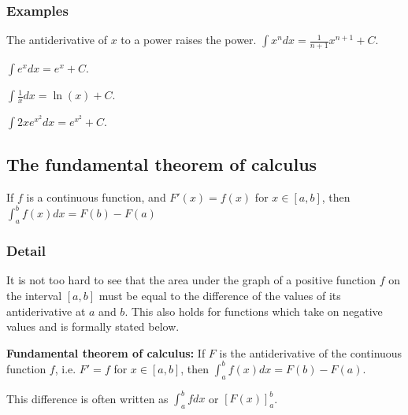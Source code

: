 \documentclass[12pt,a4paper]{article}
\theoremstyle{regla}
\theoremstyle{remark}
\theoremstyle{definition}
\theoremstyle{nonumberbreak}
\begin{document}
\subsubsection{Examples}
\begin{xmpl}
The antiderivative of $x$ to a power raises the power. 
$\int x^n dx=\frac{1}{n+1}x^{n+1} +C$.
\end{xmpl}
\begin {xmpl}

$\int e^x dx=e^x+C$.

\end{xmpl}
\begin{xmpl}

$\int \frac{1}{x} dx=\ln(x)+C$.


\end{xmpl}
\begin{xmpl}

$\int 2xe^{x^2} dx=e^{x^2}+C$.
\end{xmpl}

\subsection{The fundamental theorem of calculus}
\begin{fbox}
\begin{minipage}{0.97\textwidth}
If $f$ is a continuous function, and $F'(x)=f(x)$ for $x\in[a,b]$, then $\int_a^b f(x)dx=F(b)-F(a)$
\end{minipage}
\end{fbox}
\subsubsection{Detail}
It is not too hard to see that the area under the graph of a positive function $f$ on the interval $[a,b]$ must be equal to the difference of the values of its antiderivative at $a$ and $b$. This also holds for functions which take on negative values and is formally stated below.
\begin{defn}
\textbf{Fundamental theorem of calculus:}
If $F$ is the antiderivative of the continuous function $f$, i.e. $F'=f$ for $x\in[a,b]$, then $\int_a^b f(x)dx=F(b)-F(a)$. 

This difference is often written as $\int_a^b f dx$ or $[F(x)]_a ^b$.
\end{defn}
\end{document}
